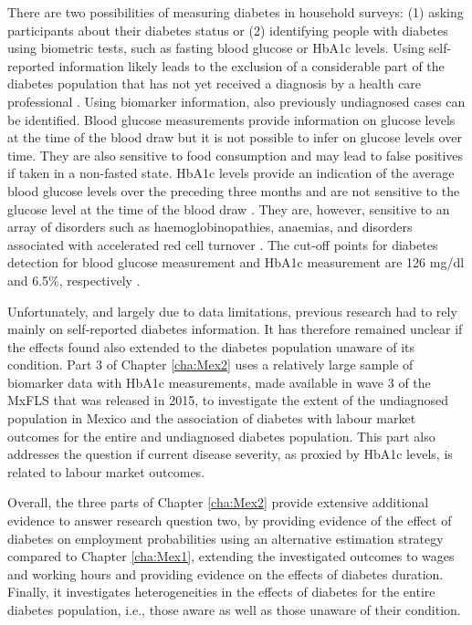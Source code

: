 There are two possibilities of measuring diabetes in household surveys: (1) asking participants about their diabetes status or (2) identifying people with diabetes using biometric tests, such as fasting blood glucose or \ac{HbA1c} levels. Using self-reported information likely leads to the exclusion of a considerable part of the diabetes population that has not yet received a diagnosis by a health care professional \parencite{Beagley2014}. Using biomarker information, also previously undiagnosed cases can be identified. Blood glucose measurements provide information on glucose levels at the time of the blood draw but it is not possible to infer on glucose levels over time. They are also sensitive to food consumption and may lead to false positives if taken in a non-fasted state. \ac{HbA1c} levels provide an indication of the average blood glucose levels over the preceding three months and are not sensitive to the glucose level at the time of the blood draw \parencite{WorldHealthOrganization2011}. They are, however, sensitive to an array of disorders such as haemoglobinopathies, anaemias, and disorders associated with accelerated red cell turnover \parencite{WorldHealthOrganization2011}. The cut-off points for diabetes detection for blood glucose measurement and \ac{HbA1c} measurement are 126 mg/dl and 6.5\%, respectively \parencite{WorldHealthOrganization2006,WorldHealthOrganization2011}.

Unfortunately, and largely due to data limitations, previous research had to rely mainly on self-reported diabetes information. It has therefore remained unclear if the effects found also extended to the diabetes population unaware of its condition. Part 3 of Chapter \ref{cha:Mex2} uses a relatively large sample of biomarker data with \ac{HbA1c} measurements, made available in wave 3 of the \ac{MxFLS} that was released in 2015, to investigate the extent of the undiagnosed population in Mexico and the association of diabetes with labour market outcomes for the entire and undiagnosed diabetes population. This part also addresses the question if current disease severity, as proxied by \ac{HbA1c} levels, is related to labour market outcomes. 

Overall, the three parts of Chapter \ref{cha:Mex2} provide extensive additional evidence to answer research question two, by providing evidence of the effect of diabetes on employment probabilities using an alternative estimation strategy compared to Chapter \ref{cha:Mex1}, extending the investigated outcomes to wages and working hours and providing evidence on the effects of diabetes duration. Finally, it investigates heterogeneities in the effects of diabetes for the entire diabetes population, i.e., those aware as well as those unaware of their condition.

